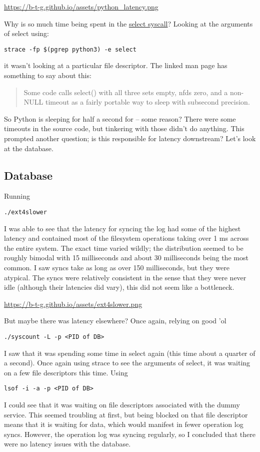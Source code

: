 \documentclass[11pt]{article}
\begin{document}
\begin{itemize}
\url{https://b-t-g.github.io/assets/python\_latency.png}

Why is so much time being spent in the \href{http://man7.org/linux/man-pages/man2/select.2.html}{select syscall}?
Looking at the arguments of select using:
\begin{verbatim}
strace -fp $(pgrep python3) -e select
\end{verbatim}
it wasn't looking at a particular file descriptor. The linked man page has something to say about this:
\begin{quote}
Some code calls select() with all three sets empty, nfds zero, and a non-NULL timeout as a fairly portable way to sleep with subsecond precision.
\end{quote}
So Python is sleeping for half a second for -- some reason? There were some timeouts in the source code, but tinkering with those didn't do anything. This prompted another question;
is this responsible for latency downstream? Let's look at the database.
\end{itemize}

\subsection*{Database}
\label{sec:org84a7dc9}
Running
\begin{verbatim}
./ext4slower
\end{verbatim}
I was able to see that the latency for syncing the log had some of the highest latency and contained most of
the filesystem operations taking over 1 ms across the entire system. The exact time varied wildly; the distribution seemed to be roughly bimodal with 15 milliseconds and about
30 milliseconds being the most common. I saw syncs take as long as over 150 milliseconds, but they were atypical. The syncs were relatively consistent in the sense that they were never idle
(although their latencies did vary), this did not seem like a bottleneck.

\url{https://b-t-g.github.io/assets/ext4slower.png}

But maybe there was latency elsewhere? Once again, relying on good 'ol
\begin{verbatim}
./syscount -L -p <PID of DB>
\end{verbatim}
I saw that it was spending some time in select again (this time about a quarter of a second).
Once again using strace to see the arguments of select, it was waiting on a few file descriptors this time. Using
\begin{verbatim}
lsof -i -a -p <PID of DB>
\end{verbatim}
I could see that it was waiting on file descriptors associated with the dummy service. This seemed troubling at first, but being blocked on that file descriptor means that it is
waiting for data, which would manifest in fewer operation log syncs. However, the operation log was syncing regularly, so I concluded that there were no latency issues with the database.
\end{document}

